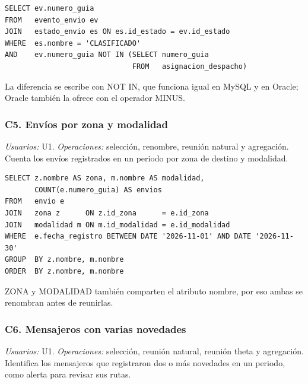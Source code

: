 \begin{lstlisting}[style=sqlpro]
SELECT ev.numero_guia
FROM   evento_envio ev
JOIN   estado_envio es ON es.id_estado = ev.id_estado
WHERE  es.nombre = 'CLASIFICADO'
AND    ev.numero_guia NOT IN (SELECT numero_guia
                              FROM   asignacion_despacho)
\end{lstlisting}
La diferencia se escribe con NOT IN, que funciona igual en MySQL y en Oracle; Oracle también la ofrece con el operador MINUS.


\subsubsection{C5. Envíos por zona y modalidad}
\label{q:C5}
\textit{Usuarios:} U1. \textit{Operaciones:} selección, renombre, reunión natural y agregación. Cuenta los envíos registrados en un periodo por zona de destino y modalidad.

\begin{center}\end{center}

\begin{lstlisting}[style=sqlpro]
SELECT z.nombre AS zona, m.nombre AS modalidad,
       COUNT(e.numero_guia) AS envios
FROM   envio e
JOIN   zona z      ON z.id_zona      = e.id_zona
JOIN   modalidad m ON m.id_modalidad = e.id_modalidad
WHERE  e.fecha_registro BETWEEN DATE '2026-11-01' AND DATE '2026-11-30'
GROUP  BY z.nombre, m.nombre
ORDER  BY z.nombre, m.nombre
\end{lstlisting}
ZONA y MODALIDAD también comparten el atributo nombre, por eso ambas se renombran antes de reunirlas.


\subsubsection{C6. Mensajeros con varias novedades}
\label{q:C6}
\textit{Usuarios:} U1. \textit{Operaciones:} selección, reunión natural, reunión theta y agregación. Identifica los mensajeros que registraron dos o más novedades en un periodo, como alerta para revisar sus rutas.

